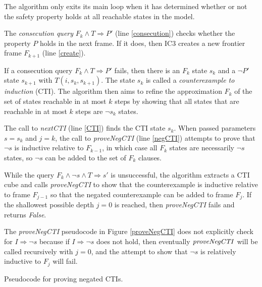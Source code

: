 \documentclass[12pt,a4paper,twoside,openright]{report}
\begin{document}
{{%
The algorithm only exits its main loop when it has determined whether or not the
safety property holds at all reachable states in the model.

The \emph{consecution query} $F_k \wedge T \Rightarrow P'$ (line \ref{consecution})
checks whether the property $P$ holds in the next
frame. If it does, then IC3 creates a new
frontier frame $F_{k + 1}$ (line \ref{create}).

If a consecution query $F_k \wedge T \Rightarrow P'$ fails, then
there is an $F_k$ state $s_k$ and a $\neg P'$ state $s_{k + 1}$ with $T(i,s_k,s_{k + 1})$.
The state $s_k$ is called a \emph{counterexample to induction} (CTI).
The algorithm then aims to refine the approximation $F_k$ of the set of states
reachable in at most $k$ steps by showing that all states that are
reachable in at most $k$ steps are $\neg s_k$ states.

The call to {\it nextCTI} (line \ref{CTI}) finds the CTI
state $s_k$. When passed parameters $s = s_k$ and $j = k$,
the call to {\it proveNegCTI} (line \ref{negCTI})
attempts to prove that $\neg s$ is inductive relative to $F_{k - 1}$,
in which case all $F_k$ states are necessarily $\neg s$ states, so $\neg s$ can
be added to the set of $F_k$ clauses.

While the query
$F_k \wedge \neg s \wedge T \Rightarrow s'$ is unsuccessful,
the algorithm extracts a CTI cube and
calls {\it proveNegCTI} to show that the counterexample is
inductive relative to frame $F_{j - 1}$ so that the negated
counterexample can be added to frame $F_j$.
If the shallowest possible depth $j = 0$ is reached, then
{\it proveNegCTI} fails and returns {\it False}.

The {\it proveNegCTI} pseudocode in Figure \ref{proveNegCTI}
does not explicitly check for $I \Rightarrow
\neg s$ because if
$I \Rightarrow \neg s$ does not hold, then eventually ${\it proveNegCTI}$
will be called recursively with $j = 0$, and the attempt to show that
$\neg s$ is relatively inductive to $F_j$ will fail.

\begin{algorithm}[t]
\DontPrintSemicolon
{}
\caption{Pseudocode for proving negated CTIs.}
\label{proveNegCTI}
\end{algorithm}

}}
\end{document}
